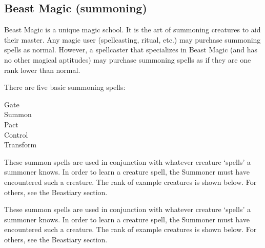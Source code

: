 \documentclass[twoside]{book}
\begin{document}
    

\subsection{Beast Magic (summoning)}
    
    {  
     Beast Magic is a unique magic school. It is the art
               of summoning creatures to aid their master. Any magic user
               (spellcasting, ritual, etc.) may purchase summoning spells
               as normal. However, a spellcaster that specializes in
               Beast Magic (and has no other magical aptitudes) may
               purchase summoning spells as if they are one rank lower
               than normal. 
    }
  
    {  
     There are five basic summoning spells: 
    }
  
\begin{description}
    
  \item[ Gate ] 
  \item[ Summon ] 
  \item[ Pact ] 
  \item[ Control ] 
  \item[ Transform ] 
\end{description}
  
    {  
     These summon spells are used in conjunction with
               whatever creature `spells' a summoner knows.
               In order to learn a creature spell, the Summoner must have
               encountered such a creature. The rank of example creatures
               is shown below. For others, see the Beastiary section.
               
    }
  
    {  
     These summon spells are used in conjunction with
               whatever creature `spells' a summoner knows.
               In order to learn a creature spell, the Summoner must have
               encountered such a creature. The rank of example creatures
               is shown below. For others, see the Beastiary section.
               
    }
  
\end{document}
